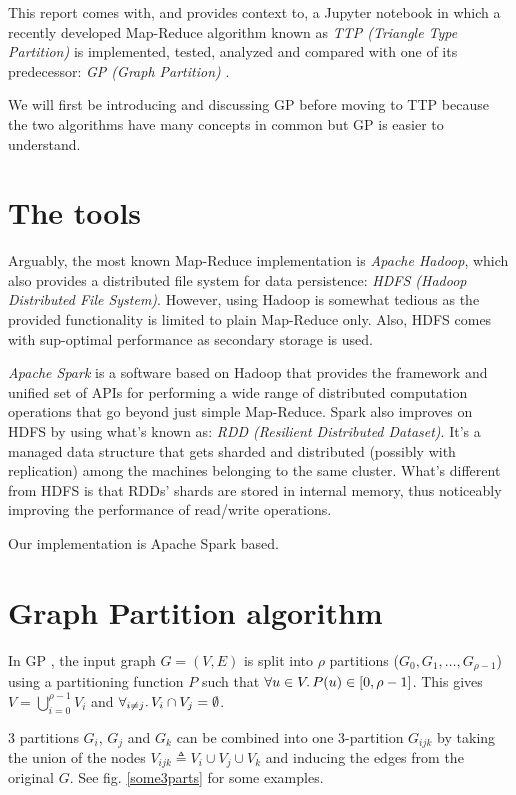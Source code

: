 \documentclass[paper=a4, fontsize=11pt]{scrartcl}
\begin{document}
This report comes with, and provides context to, a Jupyter notebook in which a
recently developed Map-Reduce algorithm known as \emph{TTP (Triangle Type
Partition)} \cite{park2013efficient} is implemented, tested, analyzed and
compared with one of its predecessor: \emph{GP (Graph Partition)}
\cite{suri2011counting}.

We will first be introducing and discussing GP before moving to TTP because the
two algorithms have many concepts in common but GP is easier to understand.

\section{The tools}
Arguably, the most known Map-Reduce implementation is \emph{Apache Hadoop},
which also provides a distributed file system for data persistence: \emph{HDFS
(Hadoop Distributed File System)}. However, using Hadoop is somewhat tedious as
the provided functionality is limited to plain Map-Reduce only. Also, HDFS comes
with sup-optimal performance as secondary storage is used.

\emph{Apache Spark} is a software based on Hadoop that provides the framework
and unified set of APIs for performing a wide range of distributed computation
operations that go beyond just simple Map-Reduce. Spark also improves on HDFS by
using what's known as: \emph{RDD (Resilient Distributed Dataset)}. It's a
managed data structure that gets sharded and distributed (possibly with
replication) among the machines belonging to the same cluster. What's different
from HDFS is that RDDs' shards are stored in internal memory, thus noticeably
improving the performance of read/write operations.

Our implementation is Apache Spark based.

\section{Graph Partition algorithm}
In GP \cite{suri2011counting}, the input graph $G=(V, E)$ is split into $\rho$
partitions ($G_0, G_1, \dots, G_{\rho-1}$) using a partitioning function $P$
such that $\forall u \in V \ldotp P(u) \in [0, \rho-1]$. This gives
$V=\bigcup_{i=0}^{\rho-1} V_i$ and $\forall_{i\neq j} \ldotp V_i \cap V_j =
\emptyset$.

3 partitions $G_i$, $G_j$ and $G_k$ can be combined into one 3-partition
$G_{ijk}$ by taking the union of the nodes $V_{ijk} \triangleq V_i \cup V_j \cup
V_k$ and inducing the edges from the original $G$. See fig. \ref{some3parts} for
some examples.
\end{document}
